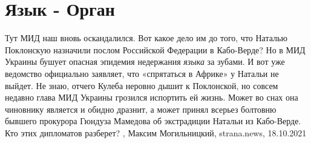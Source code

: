  
 
 
 
 
\chapter{Язык - Орган}

Тут МИД наш вновь оскандалился. Вот какое дело им до того, что Наталью
Поклонскую назначили послом Российской Федерации в Кабо-Верде? Но в МИД Украины
бушует опасная эпидемия недержания \emph{языка} за зубами. И вот уже ведомство
официально заявляет, что «спрятаться в Африке» у Натальи не выйдет.
Не знаю, отчего Кулеба неровно дышит к Поклонской, но совсем недавно глава МИД
Украины грозился испортить ей жизнь. Может во снах она чиновнику является и
обидно дразнит, а может принял всерьез болтовню бывшего прокурора Гюндуза
Мамедова об экстрадиции Натальи из Кабо-Верде. Кто этих дипломатов разберет?
, Максим Могильницкий, strana.news, 18.10.2021
